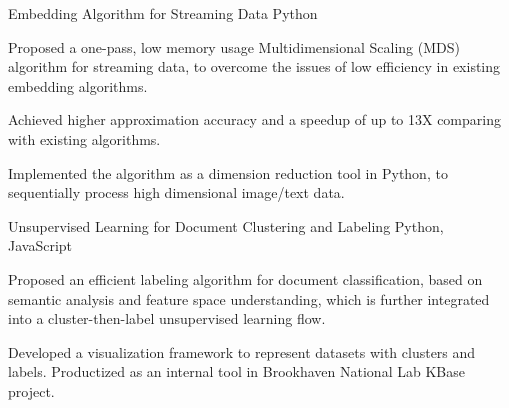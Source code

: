 


\begin{cventries}


\projentry
{Embedding Algorithm for Streaming Data} %
{Python} %
{ 
\begin{cvitems}
\item{Proposed a one-pass, low memory usage Multidimensional Scaling ({MDS}) algorithm for streaming data, to overcome the issues of low efficiency in existing embedding algorithms.}
\item{Achieved higher approximation accuracy and a speedup of up to 13X comparing with existing algorithms.}
\item{Implemented the algorithm as a dimension reduction tool in Python, to sequentially process high dimensional image/text data. }
\end{cvitems}
}


\projentry
{Unsupervised Learning for Document Clustering and Labeling} %
{Python, JavaScript} %
{ 
\begin{cvitems}
\item{Proposed an efficient labeling algorithm for document classification, based on semantic analysis and  feature space understanding, which is further integrated into a cluster-then-label unsupervised learning flow. }
\item{Developed a visualization framework to represent datasets with clusters and labels. Productized as an internal tool in Brookhaven National Lab KBase project.}
\end{cvitems}
}


\end{cventries}
